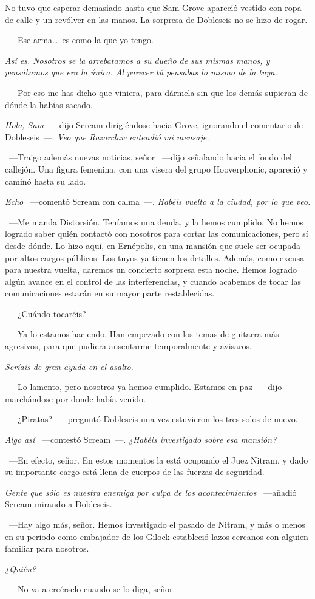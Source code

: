 No tuvo que esperar demasiado hasta que Sam Grove apareció vestido con ropa de calle y un revólver en las manos. La sorpresa de Dobleseis no se hizo de rogar.

~---Ese arma\dots\ es como la que yo tengo.

\emph{Así es. Nosotros se la arrebatamos a su dueño de sus mismas manos, y pensábamos que era la única. Al parecer tú pensabas lo mismo de la tuya.}

~---Por eso me has dicho que viniera, para dármela sin que los demás supieran de dónde la habías sacado.

\emph{Hola, Sam} ~---dijo Scream dirigiéndose hacia Grove, ignorando el comentario de Dobleseis~---. \emph{Veo que Razorclaw entendió mi mensaje.}

~---Traigo además nuevas noticias, señor ~---dijo señalando hacia el fondo del callejón. Una figura femenina, con una visera del grupo Hooverphonic, apareció y caminó hasta su lado.

\emph{Echo} ~---comentó Scream con calma~---. \emph{Habéis vuelto a la ciudad, por lo que veo.}

~---Me manda Distorsión. Teníamos una deuda, y la hemos cumplido. No hemos logrado saber quién contactó con nosotros para cortar las comunicaciones, pero sí desde dónde. Lo hizo aquí, en Ernépolis, en una mansión que suele ser ocupada por altos cargos públicos. Los tuyos ya tienen los detalles. Además, como excusa para nuestra vuelta, daremos un concierto sorpresa esta noche. Hemos logrado algún avance en el control de las interferencias, y cuando acabemos de tocar las comunicaciones estarán en su mayor parte restablecidas.

~---¿Cuándo tocaréis?

~---Ya lo estamos haciendo. Han empezado con los temas de guitarra más agresivos, para que pudiera ausentarme temporalmente y avisaros.

\emph{Seríais de gran ayuda en el asalto.}

~---Lo lamento, pero nosotros ya hemos cumplido. Estamos en paz ~---dijo marchándose por donde había venido.

~---¿Piratas? ~---preguntó Dobleseis una vez estuvieron los tres solos de nuevo.

\emph{Algo así} ~---contestó Scream~---. \emph{¿Habéis investigado sobre esa mansión?}

~---En efecto, señor. En estos momentos la está ocupando el Juez Nitram, y dado su importante cargo está llena de cuerpos de las fuerzas de seguridad.

\emph{Gente que sólo es nuestra enemiga por culpa de los acontecimientos} ~---añadió Scream mirando a Dobleseis.

~---Hay algo más, señor. Hemos investigado el pasado de Nitram, y más o menos en su periodo como embajador de los Gilock estableció lazos cercanos con alguien familiar para nosotros.

\emph{¿Quién?}

~---No va a creérselo cuando se lo diga, señor.
